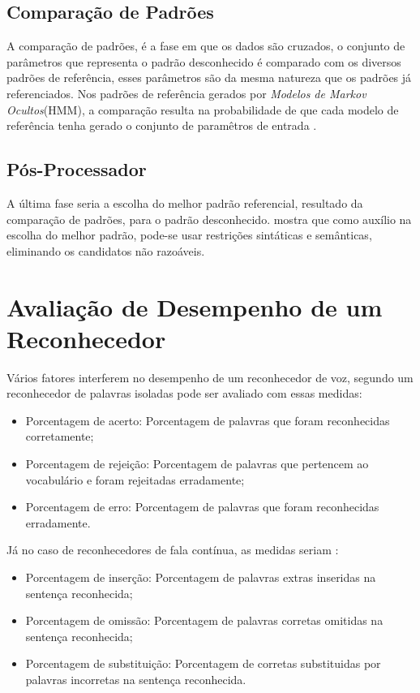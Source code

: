 \subsection{Comparação de Padrões}

A comparação de padrões, é a fase em que os dados são cruzados, o conjunto de parâmetros que representa o padrão desconhecido é comparado com os diversos padrões de referência, esses parâmetros são da mesma natureza que os padrões já referenciados.
Nos padrões de referência gerados por \textit{Modelos de Markov Ocultos}(HMM), a comparação resulta na probabilidade de que cada modelo de referência tenha gerado o conjunto de paramêtros de entrada \cite{AvaliaTecJose}.


\subsection{Pós-Processador}

A última fase seria a escolha do melhor padrão referencial, resultado da comparação de padrões, para o padrão desconhecido.  mostra que como auxílio na escolha do melhor padrão, pode-se usar restrições sintáticas e semânticas, eliminando os candidatos não razoáveis. 

\section{Avaliação de Desempenho de um Reconhecedor}
Vários fatores interferem no desempenho de um reconhecedor de voz, segundo  um reconhecedor de palavras isoladas pode ser avaliado com essas medidas:

\begin{itemize}
\item Porcentagem de acerto: Porcentagem de palavras que foram reconhecidas corretamente;
\item Porcentagem de rejeição: Porcentagem de palavras que pertencem ao vocabulário e foram rejeitadas erradamente;
\item Porcentagem de erro: Porcentagem de palavras que foram reconhecidas erradamente.
\end{itemize}

Já no caso de reconhecedores de fala contínua, as medidas seriam \cite{AvaliaTecJose}:
\begin{itemize}
\item Porcentagem de inserção: Porcentagem de palavras extras inseridas na sentença reconhecida;
\item Porcentagem de omissão: Porcentagem de palavras corretas omitidas na sentença reconhecida;
\item Porcentagem de substituição: Porcentagem de corretas substituidas por palavras incorretas na sentença reconhecida.
\end{itemize}

